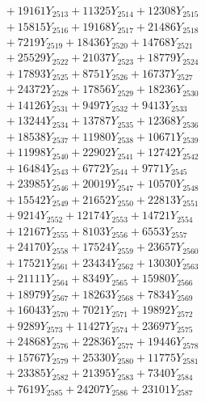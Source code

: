 \documentclass[a4paper,10pt]{article}
\begin{document}
{\begin{align}
&\;  + 19161 Y_{2513} + 11325 Y_{2514} + 12308 Y_{2515} \\[0.3ex]
&\;  + 15815 Y_{2516} + 19168 Y_{2517} + 21486 Y_{2518} \\[0.5ex]\allowbreak
&\;  + 7219 Y_{2519} + 18436 Y_{2520} + 14768 Y_{2521} \\[0.3ex]
&\;  + 25529 Y_{2522} + 21037 Y_{2523} + 18779 Y_{2524} \\[0.3ex]
&\;  + 17893 Y_{2525} + 8751 Y_{2526} + 16737 Y_{2527} \\[0.3ex]
&\;  + 24372 Y_{2528} + 17856 Y_{2529} + 18236 Y_{2530} \\[0.3ex]
&\;  + 14126 Y_{2531} + 9497 Y_{2532} + 9413 Y_{2533} \\[0.3ex]
&\;  + 13244 Y_{2534} + 13787 Y_{2535} + 12368 Y_{2536} \\[0.3ex]
&\;  + 18538 Y_{2537} + 11980 Y_{2538} + 10671 Y_{2539} \\[0.3ex]
&\;  + 11998 Y_{2540} + 22902 Y_{2541} + 12742 Y_{2542} \\[0.3ex]
&\;  + 16484 Y_{2543} + 6772 Y_{2544} + 9771 Y_{2545} \\[0.3ex]
&\;  + 23985 Y_{2546} + 20019 Y_{2547} + 10570 Y_{2548} \\[0.5ex]\allowbreak
&\;  + 15542 Y_{2549} + 21652 Y_{2550} + 22813 Y_{2551} \\[0.3ex]
&\;  + 9214 Y_{2552} + 12174 Y_{2553} + 14721 Y_{2554} \\[0.3ex]
&\;  + 12167 Y_{2555} + 8103 Y_{2556} + 6553 Y_{2557} \\[0.3ex]
&\;  + 24170 Y_{2558} + 17524 Y_{2559} + 23657 Y_{2560} \\[0.3ex]
&\;  + 17521 Y_{2561} + 23434 Y_{2562} + 13030 Y_{2563} \\[0.3ex]
&\;  + 21111 Y_{2564} + 8349 Y_{2565} + 15980 Y_{2566} \\[0.3ex]
&\;  + 18979 Y_{2567} + 18263 Y_{2568} + 7834 Y_{2569} \\[0.3ex]
&\;  + 16043 Y_{2570} + 7021 Y_{2571} + 19892 Y_{2572} \\[0.3ex]
&\;  + 9289 Y_{2573} + 11427 Y_{2574} + 23697 Y_{2575} \\[0.3ex]
&\;  + 24868 Y_{2576} + 22836 Y_{2577} + 19446 Y_{2578} \\[0.5ex]\allowbreak
&\;  + 15767 Y_{2579} + 25330 Y_{2580} + 11775 Y_{2581} \\[0.3ex]
&\;  + 23385 Y_{2582} + 21395 Y_{2583} + 7340 Y_{2584} \\[0.3ex]
&\;  + 7619 Y_{2585} + 24207 Y_{2586} + 23101 Y_{2587} \\[0.3ex]

\end{align}}
\end{document}
